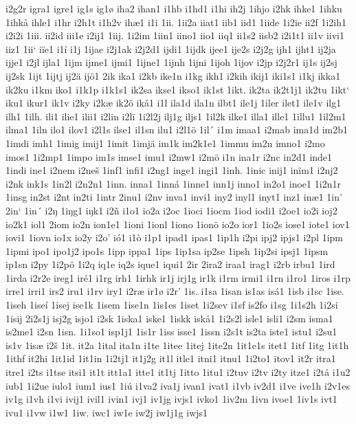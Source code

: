 i2g2r
igra1
igre1
ig1s
ig1ø
iha2
ihan1
i1hb
i1hd1
i1hi
ih2j
1ihjo
i2hk
ihke1
1ihku
1ihkå
ihle1
i1hr
i2h1t
i1h2v
ihæ1
i1i
1ii.
1ii2a
iiat1
iib1
iid1
1iide
1i2ie
ii2f
1i2ih1
i2i2i
1iii.
ii2id
iii1e
i2ij1
1iij.
1i2im
1iin1
iino1
iio1
iiq1
ii1s2
iisb2
i2i1t1
ii1v
iivi1
iiz1
1ii`
iïe1
i1í
i1j
1ijae
i2j1ak
i2j2d1
ijdi1
1ijdk
ijee1
ije2s
i2j2g
ijh1
ijht1
ij2ja
ijje1
i2jl
ijla1
1ijm
ijme1
ijmi1
1ijne1
1ijnh
1ijni
1ijoh
1ijov
i2jp
i2j2r1
ij1s
ij2sj
ij2sk
1ijt
1ijtj
ij2ä
ijö1
2ik
ika1
i2kb
ike1n
i1kg
ikh1
i2kih
ikij1
iki1s1
i1kj
ikka1
ik2ku
i1km
iko1
i1k1p
i1k1s1
ik2sa
ikse1
ikso1
ik1st
1ikt.
ik2ta
ik2t1j1
ik2tu
1ikt`
iku1
ikur1
ik1v
i2ky
i2kæ
ik2ö
ikå1
i1l
ila1d
ila1n
ilbt1
ile1j
1iler
ilet1
ile1v
ilg1
ilh1
1ilh.
ili1
ilie1
ilii1
i2lin
i2lï
1i2l2j
ilj1g
iljs1
1il2k
ilke1
illa1
ille1
1illu1
1il2m1
ilma1
1iln
ilo1
ilov1
i2l1s
ilse1
il1sn
ilu1
i2l1ö
1il´
i1m
imaa1
i2mab
ima1d
im2b1
1imdi
imh1
1imig
imij1
1imit
1imjä
im1k
im2k1e1
1immu
im2n
imno1
i2mo
imos1
1i2mp1
1impo
im1s
imse1
imu1
i2mw1
i2mö
i1n
ina1r
i2nc
in2d1
inde1
1indi
ine1
i2nem
i2neš
1inf1
infi1
i2ng1
inge1
ingi1
1inh.
1inic
inij1
inïm1
i2nj2
i2nk
ink1s
1in2l
i2n2n1
1inn.
inna1
1inná
1inne1
inn1j
inno1
in2o1
inoe1
1i2n1r
1insg
in2st
i2nt
in2ti
1intr
2inu1
i2nv
inva1
invi1
iny2
inyl1
inyt1
inz1
inæ1
1in'
2in`
1in´
i2ŋ
1iŋg1
iŋk1
i2ñ
i1o1
io2a
i2oc
1ioci
1iocm
1iod
iodi1
i2oe1
io2i
ioj2
io2k1
iol1
2iom
io2n
ion1e1
1ioni
1ionl
1iono
1ionö
io2o
ior1
1io2s
iose1
iote1
iov1
iovi1
1iovn
io1x
io2y
i2o'
ió1
i1ò
i1p1
ipad1
ipas1
1ip1h
i2pi
ipj2
ipjs1
i2pl
1ipm
1ipmi
ipo1
ipo1j2
ipo1s
1ipp
ippa1
1ips
1ip1sa
ip2se
1ipsh
1ip2si
ipsj1
1ipsm
ip1sn
i2py
1i2pö
1i2q
iq1e
iq2s
ique1
iqui1
2ir
2ira2
iraa1
irag1
i2rb
irbu1
1ird
1irda
i2r2e
ireg1
iré1
i1rg
irh1
1irhk
ir1j
irj1g
ir1k
i1rm
irmi1
i1rn
i1ro1
1iros
i1rp
irre1
irri1
irs2
iru1
i1rv
iry1
i2ræ
ir1ø
i2r'
1is.
i1sa
1isan
is1as
isá1
1isb
i1sc
1ise.
1iseh
1iseí
1isej
ise1k
1isem
1ise1n
1is1es
1iset
1i2sev
i1sf
is2fo
i1sg
1i1s2h
1i2si
1isij
2i2s1j
isj2g
isjo1
i2sk
1iska1
iske1
1iskk
iskå1
1i2s2l
isle1
isli1
i2sm
isma1
is2me1
i2sn
1isn.
1i1so1
isp1j1
1is1r
1iss
isse1
1issn
i2s1t
is2ta
iste1
istu1
i2su1
is1v
1isæ
i2š
1it.
it2a
1ital
ita1n
i1te
1itee
1itej
1ite2n
1it1e1s
itet1
1itf
1itg
1it1h
1ithf
it2hi
1it1id
1it1in
1i2tj1
it1j2g
it1l
itle1
itni1
itnu1
1i2to1
itov1
it2r
itra1
itre1
i2ts
i1tse
itsi1
it1t
itt1a1
itte1
it1tj
1itto
1itu1
i2tuv
i2tv
i2ty
itze1
i2tå
i1u2
iub1
1i2ue
iulo1
ium1
ius1
1iú
i1va2
iva1j
ivan1
ivat1
i1vb
iv2d1
i1ve
ive1h
i2v1es
iv1g
i1vh
i1vi
ivij1
ivil1
ivin1
ivj1
iv1jg
ivjs1
ivko1
1iv2m
1ivn
ivoe1
1iv1s
ivt1
ivu1
i1vw
i1w1
1iw.
iwc1
iw1e
iw2j
iw1j1g
iwjs1
